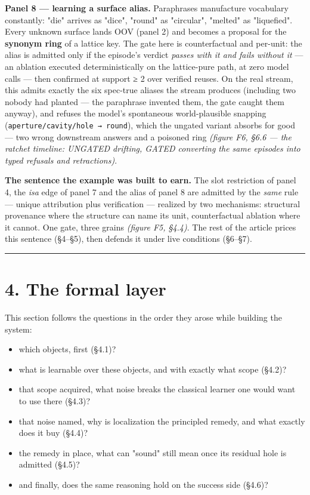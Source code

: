 \documentclass[11pt]{article}
\begin{document}
\textbf{Panel 8 — learning a surface alias.} Paraphrases manufacture vocabulary constantly: "die" arrives as "dice", "round" as "circular", "melted" as "liquefied". Every unknown surface lands OOV (panel 2) and becomes a proposal for the \textbf{synonym ring} of a lattice key. The gate here is counterfactual and per-unit: the alias is admitted only if the episode's verdict \emph{passes with it and fails without it} — an ablation executed deterministically on the lattice-pure path, at zero model calls — then confirmed at support ≥ 2 over verified reuses. On the real stream, this admits exactly the six spec-true aliases the stream produces (including two nobody had planted — the paraphrase invented them, the gate caught them anyway), and refuses the model's spontaneous world-plausible snapping (\texttt{aperture/\allowbreak{}cavity/\allowbreak{}hole → round}), which the ungated variant absorbs for good — two wrong downstream answers and a poisoned ring \emph{(figure F6, §6.6 — the ratchet timeline: UNGATED drifting, GATED converting the same episodes into typed refusals and retractions)}.

\textbf{The sentence the example was built to earn.} The slot restriction of panel 4, the \emph{isa} edge of panel 7 and the alias of panel 8 are admitted by the \emph{same} rule — unique attribution plus verification — realized by two mechanisms: structural provenance where the structure can name its unit, counterfactual ablation where it cannot. One gate, three grains \emph{(figure F5, §4.4)}. The rest of the article prices this sentence (§4–§5), then defends it under live conditions (§6–§7).

\medskip\hrule\medskip

\section*{4. The formal layer}

This section follows the questions in the order they arose while building the system:

\begin{itemize}
\item which objects, first (§4.1)?
\item what is learnable over these objects, and with exactly what scope (§4.2)?
\item that scope acquired, what noise breaks the classical learner one would want to use there (§4.3)?
\item that noise named, why is localization the principled remedy, and what exactly does it buy (§4.4)?
\item the remedy in place, what can "sound" still mean once its residual hole is admitted (§4.5)?
\item and finally, does the same reasoning hold on the success side (§4.6)?
\end{itemize}
\end{document}
